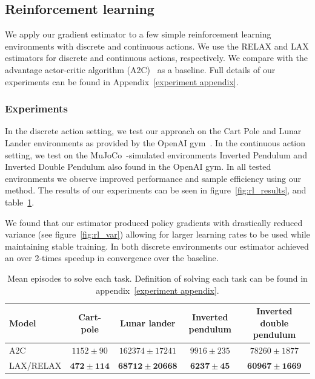 \documentclass{article}
\newcommand{\LAX}{{\textnormal{LAX}}}
\newcommand{\RELAX}{{\textnormal{RELAX}}}
\begin{document}
\subsection{Reinforcement learning}
We apply our gradient estimator to a few simple reinforcement learning environments with discrete and continuous actions.
We use the \RELAX{} and \LAX{} estimators for discrete and continuous actions, respectively.
We compare with the advantage actor-critic algorithm (A2C)~\citep{sutton2000policy} as a baseline.
Full details of our experiments can be found in Appendix~\ref{experiment appendix}.



\subsubsection{Experiments}
\label{experiments section}
In the discrete action setting, we test our approach on the Cart Pole and Lunar Lander environments as provided by the OpenAI gym~\citep{1606.01540}.
In the continuous action setting, we test on the MuJoCo~\citep{todorov2012mujoco}-simulated environments Inverted Pendulum and Inverted Double Pendulum also found in the OpenAI gym.
In all tested environments we observe improved performance and sample efficiency using our method.
The results of our experiments can be seen in figure~\ref{fig:rl_results}, and table~\ref{tab:rl_results}.

We found that our estimator produced policy gradients with drastically reduced variance (see figure~\ref{fig:rl_var}) allowing for larger learning rates to be used while maintaining stable training.
In both discrete environments our estimator achieved an over 2-times speedup in convergence over the baseline.



\begin{table}[h]
\centering
\begin{tabular}{l | c c c c } 
\textbf{Model} & Cart-pole & Lunar lander & Inverted pendulum & Inverted double pendulum \\\midrule
A2C             & $1152 \pm 90$ & $162374 \pm 17241$                    & $9916 \pm 235$ & $78260 \pm 1877$  \\
LAX/RELAX & $\bm{472 \pm 114}$ & $\bm{68712 \pm 20668}$ & $\bm{6237 \pm 45}$ & $\bm{60967 \pm 1669}$
\end{tabular}
\caption{Mean episodes to solve each task.
Definition of solving each task can be found in appendix~\ref{experiment appendix}.}
\label{tab:rl_results}
\end{table}
\end{document}
